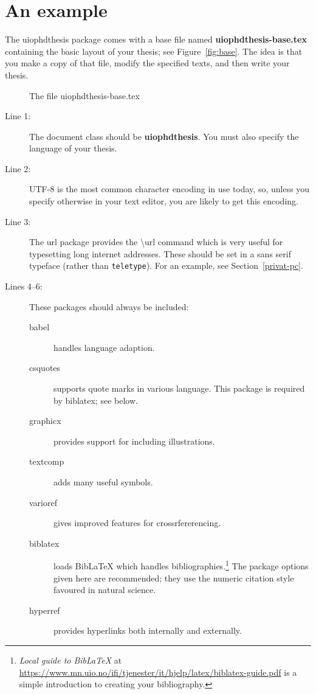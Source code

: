 \documentclass[UKenglish]{uiophdthesis}
\newcommand{\bsl}{\textbackslash}
\newcommand{\p}[1]{\textsf{#1}}
\newcommand{\pb}[1]{\textbf{\p{#1}}}
\newcommand{\pcmd}[1]{\p{\bsl #1}}
\begin{document}
\section{An example}
The \p{uiophdthesis} package comes with a base file named
\pb{uiophdthesis-base.tex} containing the basic layout of your thesis;
see Figure~\vref{fig:base}. The idea is that you make a copy of that
file, modify the specified texts, and then write your thesis.

\begin{figure}[htp]
  \VerbatimInput[fontsize=\footnotesize,frame=single,obeytabs,
    label={\pb{uiophdthesis-base.tex}},numbers=left]{uiophdthesis-base.tex}
  \caption{The file \p{uiophdthesis-base.tex}\label{fig:base}}
\end{figure}

\begin{description}
\item[Line 1:] The document class should be \pb{uiophdthesis}. You must
  also specify the language of your thesis.
\item[Line 2:] UTF-8 is the most common character encoding in use
  today, so, unless you specify otherwise in your text editor, you are
  likely to get this encoding.
\item[Line 3:] The \p{url} package provides the \pcmd{url}
  command which is very useful for typesetting long internet
  addresses. These should be set in a \textsf{sans serif} typeface
  (rather than \texttt{teletype}). For an example, see
  Section~\vref{privat-pc}.
\item[Lines 4--6:] These packages should always be included:
  \begin{description}
  \item[\p{babel}] handles language adaption.
  \item[\p{csquotes}] supports quote marks in various language. This
    package is required by \p{biblatex}; see below.
  \item[\p{graphicx}] provides support for including illustrations.
  \item[\p{textcomp}] adds many useful symbols.
  \item[\p{varioref}] gives improved features for crossrfererencing.
  \item[\p{biblatex}] loads Bib\LaTeX{} which handles
    bibliographies.\footnote{\emph{Local guide to Bib\LaTeX} at
      \url{https://www.mn.uio.no/ifi/tjenester/it/hjelp/latex/biblatex-guide.pdf}
      is a simple introduction to creating your bibliography.}
    The package options given here are recommended; they use the
    numeric citation style favoured in natural science.
  \item[\p{hyperref}] provides hyperlinks both internally and externally.
  \end{description}


\end{description}
\end{document}
